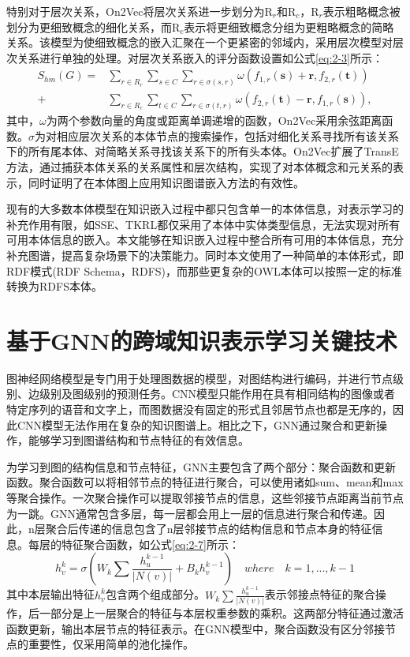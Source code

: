 特别对于层次关系，On2Vec将层次关系进一步划分为R$_{r}$和R$_{c}$，R$_{r}$表示粗略概念被划分为更细致概念的细化关系，而R$_{c}$表示将更细致概念分组为更粗略概念的简略关系。该模型为使细致概念的嵌入汇聚在一个更紧密的邻域内，采用层次模型对层次关系进行单独的处理。对层次关系嵌入的评分函数设置如公式\ref{eq:2-3}所示：
\begin{equation}
  \begin{aligned} 
    S_{hm}(G) = &\sum_{r\in R_{r}} \sum_{s\in C} \sum_{r\in \sigma(s,r)} \omega(f_{1,r}(\textbf{s}) + \textbf{r},f_{2,r}(\textbf{t}))\\
    + &\sum_{r\in R_{c}} \sum_{t\in C} \sum_{r\in \sigma(t,r)} \omega(f_{2,r}(\textbf{t}) -\textbf{r},f_{1,r}(\textbf{s})),
    \end{aligned} \label{eq:2-3}
\end{equation}
其中，\(\omega\)为两个参数向量的角度或距离单调递增的函数，On2Vec采用余弦距离函数。\(\sigma\)为对相应层次关系的本体节点的搜索操作，包括对细化关系寻找所有该关系下的所有尾本体、对简略关系寻找该关系下的所有头本体。On2Vec扩展了TransE方法，通过捕获本体关系的关系属性和层次结构，实现了对本体概念和元关系的表示，同时证明了在本体图上应用知识图谱嵌入方法的有效性。

现有的大多数本体模型在知识嵌入过程中都只包含单一的本体信息，对表示学习的补充作用有限，如SSE\cite{guo2016sse}、TKRL\cite{xie2016representation-TKRL}都仅采用了本体中实体类型信息，无法实现对所有可用本体信息的嵌入。本文能够在知识嵌入过程中整合所有可用的本体信息，充分补充图谱，提高复杂场景下的决策能力。同时本文使用了一种简单的本体形式，即RDF模式(RDF Schema，RDFS)，而那些更复杂的OWL本体可以按照一定的标准转换为RDFS本体。

\section{基于GNN的跨域知识表示学习关键技术}
图神经网络模型是专门用于处理图数据的模型，对图结构进行编码，并进行节点级别、边级别及图级别的预测任务。CNN模型只能作用在具有相同结构的图像或者特定序列的语音和文字上，而图数据没有固定的形式且邻居节点也都是无序的，因此CNN模型无法作用在复杂的知识图谱上。相比之下，GNN通过聚合和更新操作，能够学习到图谱结构和节点特征的有效信息。

为学习到图的结构信息和节点特征，GNN主要包含了两个部分：聚合函数和更新函数。聚合函数可以将相邻节点的特征进行聚合，可以使用诸如sum、mean和max等聚合操作。一次聚合操作可以提取邻接节点的信息，这些邻接节点距离当前节点为一跳。GNN通常包含多层，每一层都会用上一层的信息进行聚合和传递。因此，n层聚合后传递的信息包含了n层邻接节点的结构信息和节点本身的特征信息。每层的特征聚合函数，如公式\ref{eq:2-7}所示：
\begin{equation}
  h_{v}^{k} = \sigma(W_{k} \sum \frac{h_{u}^{k-1}}{|N(v)|} + B_{k}h_{v}^{k-1}) \quad where \quad k = 1, ..., k-1 \label{eq:2-7}
\end{equation}
其中本层输出特征\(h_{v}^{k}\)包含两个组成部分。\(W_{k}\sum\frac{h^{k-1}_{u}}{|N(v)|}\)表示邻接点特征的聚合操作，后一部分是上一层聚合的特征与本层权重参数的乘积。这两部分特征通过激活函数更新，输出本层节点的特征表示。在GNN模型中，聚合函数没有区分邻接节点的重要性，仅采用简单的池化操作。

